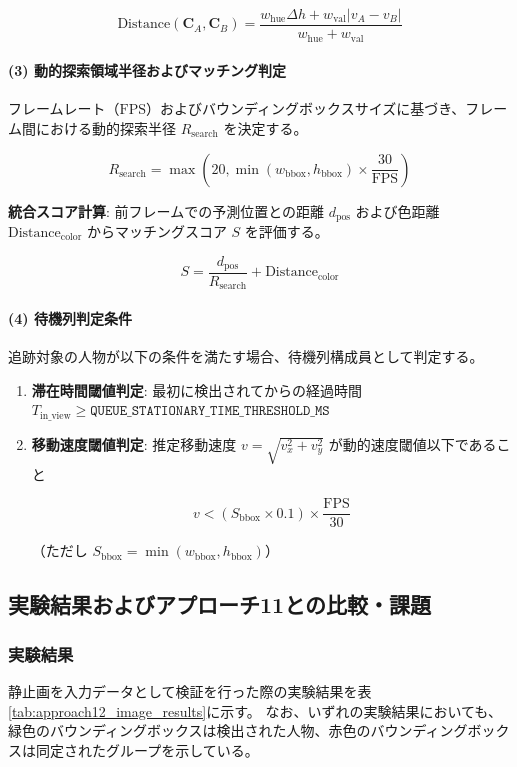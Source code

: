 $$\text{Distance}(\mathbf{C}_A, \mathbf{C}_B) = \frac{w_{\text{hue}} \Delta h + w_{\text{val}} \vert{}v_A - v_B\vert{}}{w_{\text{hue}} + w_{\text{val}}}$$

\paragraph{(3) 動的探索領域半径およびマッチング判定}
フレームレート（$\text{FPS}$）およびバウンディングボックスサイズに基づき、フレーム間における動的探索半径 $R_{\text{search}}$ を決定する。

$$R_{\text{search}} = \max\left(20, \min(w_{\text{bbox}}, h_{\text{bbox}}) \times \frac{30}{\text{FPS}}\right)$$

\textbf{統合スコア計算}:
前フレームでの予測位置との距離 $d_{\text{pos}}$ および色距離 $\text{Distance}_{\text{color}}$ からマッチングスコア $S$ を評価する。

$$S = \frac{d_{\text{pos}}}{R_{\text{search}}} + \text{Distance}_{\text{color}}$$

\paragraph{(4) 待機列判定条件}
追跡対象の人物が以下の条件を満たす場合、待機列構成員として判定する。

\begin{enumerate}
    \item \textbf{滞在時間閾値判定}: 最初に検出されてからの経過時間 $T_{\text{in\_view}} \ge \mathtt{QUEUE\_STATIONARY\_TIME\_THRESHOLD\_MS}$
    \item \textbf{移動速度閾値判定}: 推定移動速度 $v = \sqrt{v_x^2 + v_y^2}$ が動的速度閾値以下であること

$$v < (S_{\text{bbox}} \times 0.1) \times \frac{\text{FPS}}{30}$$

（ただし $S_{\text{bbox}} = \min(w_{\text{bbox}}, h_{\text{bbox}})$）
\end{enumerate}

\subsection{実験結果およびアプローチ11との比較・課題}

\subsubsection{実験結果}
静止画を入力データとして検証を行った際の実験結果を表\ref{tab:approach12_image_results}に示す。
なお、いずれの実験結果においても、緑色のバウンディングボックスは検出された人物、赤色のバウンディングボックスは同定されたグループを示している。

